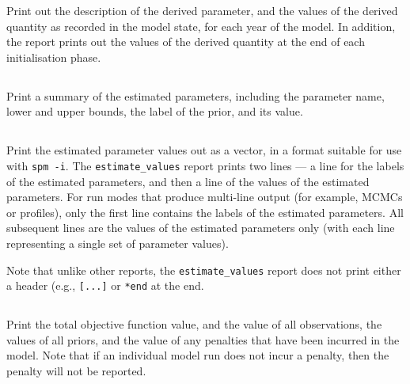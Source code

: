 Print out the description of the derived parameter, and the values of the derived quantity as recorded in the model state, for each year of the model. In addition, the report prints out the values of the derived quantity at the end of each initialisation phase.

\subsection{}

Print a summary of the estimated parameters, including the parameter name, lower and upper bounds, the label of the prior, and its value.

\subsection{}

Print the estimated parameter values out as a vector, in a format suitable for use with \texttt{spm -i}. The \texttt{estimate\_values} report prints two lines --- a line for the labels of the estimated parameters, and then a line of the values of the estimated parameters. For run modes that produce multi-line output (for example, MCMCs or profiles), only the first line contains the labels of the  estimated parameters. All subsequent lines are the values of the estimated parameters only (with each line representing a single set of parameter values). 

Note that unlike other reports, the \texttt{estimate\_values} report does not print either a header (e.g., \texttt{[...]} or \texttt{*end} at the end. 

\subsection{}

Print the total objective function value, and the value of all observations, the values of all priors, and the value of any penalties that have been incurred in the model. Note that if an individual model run does not incur a penalty, then the penalty will not be reported.

\subsection{}

